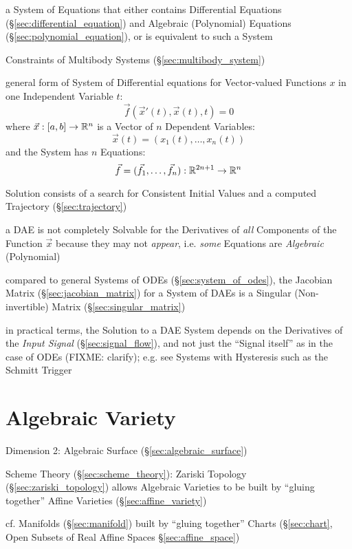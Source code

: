 a System of Equations that either contains Differential Equations
(\S\ref{sec:differential_equation}) and Algebraic (Polynomial) Equations
(\S\ref{sec:polynomial_equation}), or is equivalent to such a System

\fist Constraints of Multibody Systems (\S\ref{sec:multibody_system})

general form of System of Differential equations for Vector-valued Functions
$x$ in one Independent Variable $t$:
\[
  \vec{f}(\vec{x}'(t), \vec{x}(t), t) = 0
\]
where $\vec{x} : [a,b] \rightarrow \mathbb{R}^n$ is a Vector of $n$ Dependent
Variables:
\[
  \vec{x}(t) = (x_1(t), \ldots, x_n(t))
\]
and the System has $n$ Equations:
\[
  \vec{f} = (\vec{f}_1, \ldots, \vec{f}_n) : \mathbb{R}^{2n+1} \rightarrow \mathbb{R}^n
\]

Solution consists of a search for Consistent Initial Values and a computed
Trajectory (\S\ref{sec:trajectory})

a DAE is not completely Solvable for the Derivatives of \emph{all} Components
of the Function $\vec{x}$ because they may not \emph{appear}, i.e. \emph{some}
Equations are \emph{Algebraic} (Polynomial)

compared to general Systems of ODEs (\S\ref{sec:system_of_odes}), the Jacobian
Matrix (\S\ref{sec:jacobian_matrix}) for a System of DAEs is a Singular
(Non-invertible) Matrix (\S\ref{sec:singular_matrix})

in practical terms, the Solution to a DAE System depends on the Derivatives of
the \emph{Input Signal} (\S\ref{sec:signal_flow}), and not just the ``Signal
itself'' as in the case of ODEs
(FIXME: clarify); e.g. see Systems with Hysteresis such as the Schmitt Trigger



\section{Algebraic Variety}\label{sec:algebraic_variety}

Dimension 2: Algebraic Surface (\S\ref{sec:algebraic_surface})

Scheme Theory (\S\ref{sec:scheme_theory}): Zariski Topology
(\S\ref{sec:zariski_topology}) allows Algebraic Varieties to be built by
``gluing together'' Affine Varieties (\S\ref{sec:affine_variety})

cf. Manifolds (\S\ref{sec:manifold}) built by ``gluing together'' Charts
(\S\ref{sec:chart}, Open Subsets of Real Affine Spaces
\S\ref{sec:affine_space})


